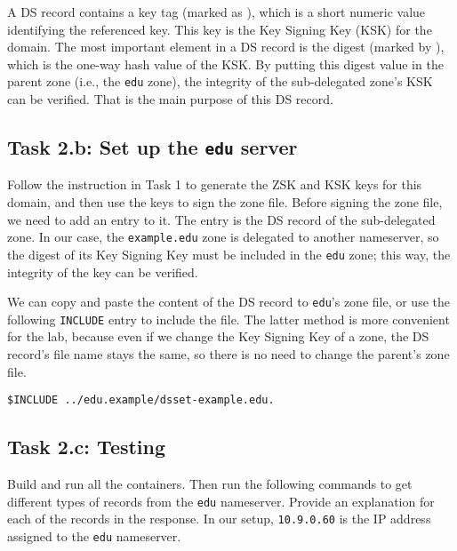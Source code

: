 A DS record contains a key tag (marked as ), which is a 
short numeric value identifying the referenced key. This key
is the Key Signing Key (KSK) for the domain.
The most important element in a DS record is the digest (marked by ),
which is the one-way hash value of the KSK. By putting this digest
value in the parent zone (i.e., the \texttt{edu} zone), 
the integrity of the sub-delegated zone's
KSK can be verified. That is the main purpose of this DS record. 



\subsection{Task 2.b: Set up the \texttt{edu} server} 

Follow the instruction in Task 1 to generate the ZSK and KSK keys 
for this domain, and then use the keys to sign
the zone file. Before signing the zone file,
we need to add an entry to it.
The entry is the DS record of the sub-delegated zone. 
In our case, the \texttt{example.edu} zone is delegated to 
another nameserver, so the digest of its Key Signing Key must 
be included in the \texttt{edu} zone; this way, the 
integrity of the key can be verified. 


We can copy and paste the content of the DS record to 
\texttt{edu}'s zone file, or use the following
\texttt{INCLUDE} entry to include the file. The latter 
method is more convenient for the lab, because even if we 
change the Key Signing Key of a zone, the DS record's file name stays the same,
so there is no need to change the parent's zone file.

\begin{lstlisting}
$INCLUDE ../edu.example/dsset-example.edu.
\end{lstlisting}
 

\subsection{Task 2.c: Testing} 

Build and run all the containers. Then
run the following commands to get different types of records
from the \texttt{edu} nameserver. Provide an explanation
for each of the records in the response. 
In our setup, \texttt{10.9.0.60} is the IP address 
assigned to the \texttt{edu} nameserver.


